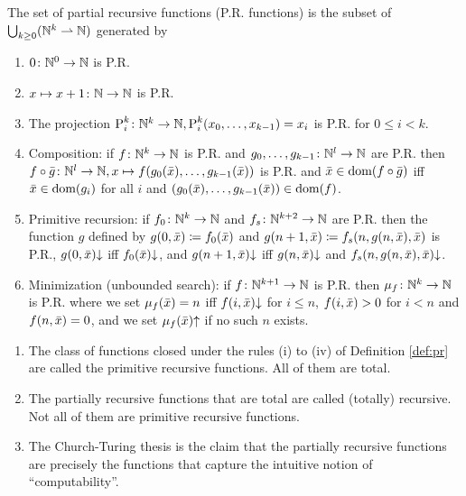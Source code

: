 \begin{boxdefi}\label{def:pr}
    The set of \alert{partial recursive functions (P.R. functions)} is the subset of $\bigcup_{k \ge 0}(\mathbb{N}^k \rightharpoonup \mathbb{N})$ generated by
    \begin{enumerate}
        \item $0 \colon \mathbb{N}^0 \to \mathbb{N}$ is P.R.
        \item $x \mapsto x + 1 \colon \mathbb{N} \to \mathbb{N}$ is P.R.
        \item The projection $\text{P}_{i}^{k} \colon \mathbb{N}^k \to \mathbb{N},  \text{P}_{i}^{k}(x_0, \dots, x_{k-1}) = x_i$ is P.R. for $0 \le i < k$.
        \item Composition: if $f \colon \mathbb{N}^k \to \mathbb{N}$ is P.R. and $g_0, \dots, g_{k-1} \colon \mathbb{N}^l \to \mathbb{N}$ are P.R. then $f \circ \bar{g} \colon \mathbb{N}^l \to \mathbb{N}, x \mapsto f(g_0(\bar{x}), \dots, g_{k-1}(\bar{x}))$ is P.R. and $\bar{x} \in \text{dom}(f \circ \bar{g})$ iff $\bar{x} \in \text{dom}(g_i)$ for all $i$ and $(g_0(\bar{x}), \dots, g_{k-1}(\bar{x})) \in \text{dom}(f)$.
    \item Primitive recursion: if $f_0 \colon \mathbb{N}^k \to \mathbb{N}$ and $f_s \colon \mathbb{N}^{k+2} \to \mathbb{N}$ are P.R. then the function $g$ defined by $g(0, \bar{x}) \coloneq f_0(\bar{x})$ and $g(n+1, \bar{x}) \coloneq f_s(n, g(n, \bar{x}), \bar{x})$ is P.R., $g(0, \bar{x}){\downarrow}$ iff $f_0(\bar{x}){\downarrow}$, and $g(n + 1, \bar{x}){\downarrow}$ iff $g(n, \bar{x}){\downarrow}$ and $f_s(n, g(n, \bar{x}), \bar{x}){\downarrow}$. 
    \item Minimization (unbounded search): if $f \colon \mathbb{N}^{k + 1} \to \mathbb{N}$ is P.R. then $\mu_f \colon \mathbb{N}^k \to \mathbb{N}$ is P.R. where we set $\mu_f(\bar{x}) = n$ iff $f(i, \bar{x}){\downarrow}$ for $i \le n$, $f(i, \bar{x}) > 0$ for $i < n$ and $f(n, \bar{x}) = 0$, and we set $\mu_f(\bar{x}){\uparrow}$ if no such $n$ exists.
    \end{enumerate}
\end{boxdefi}

\begin{rem}
    \hfill
    \begin{enumerate}
        \item The class of functions closed under the rules (i) to (iv) of Definition \ref{def:pr} are called the \alert{primitive recursive functions}. All  of them are total.
        \item The partially recursive functions that are total are called \alert{(totally) recursive}. Not all of them are primitive recursive functions.
        \item The Church-Turing thesis is the claim that the partially recursive functions are precisely the functions that capture the intuitive notion of ``computability''.
    \end{enumerate}
\end{rem}